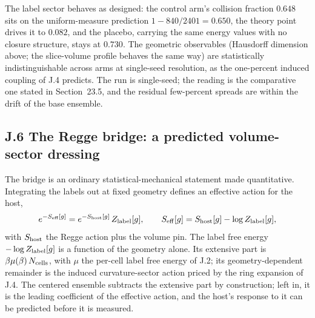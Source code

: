\documentclass[11pt]{article}
\begin{document}
The label sector behaves as designed: the control arm's collision fraction $0.648$ sits on the uniform-measure prediction $1-840/2401=0.650$, the theory point drives it to $0.082$, and the placebo, carrying the same energy values with no closure structure, stays at $0.730$. The geometric observables (Hausdorff dimension above; the slice-volume profile behaves the same way) are statistically indistinguishable across arms at single-seed resolution, as the one-percent induced coupling of J.4 predicts. The run is single-seed; the reading is the comparative one stated in Section~23.5, and the residual few-percent spreads are within the drift of the base ensemble.

\subsection*{J.6 The Regge bridge: a predicted volume-sector dressing}

The bridge is an ordinary statistical-mechanical statement made quantitative. Integrating the labels out at fixed geometry defines an effective action for the host,
\[
e^{-S_{\rm eff}[g]}=e^{-S_{\rm host}[g]}\,Z_{\rm label}[g],
\qquad
S_{\rm eff}[g]=S_{\rm host}[g]-\log Z_{\rm label}[g],
\]
with $S_{\rm host}$ the Regge action plus the volume pin. The label free energy $-\log Z_{\rm label}[g]$ is a function of the geometry alone. Its extensive part is $\beta\mu(\beta)\,N_{\rm cells}$, with $\mu$ the per-cell label free energy of J.2; its geometry-dependent remainder is the induced curvature-sector action priced by the ring expansion of J.4. The centered ensemble subtracts the extensive part by construction; left in, it is the leading coefficient of the effective action, and the host's response to it can be predicted before it is measured.
\end{document}
